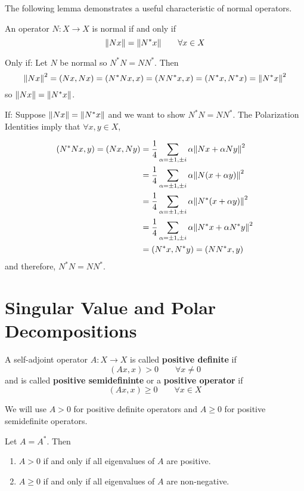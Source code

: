 The following lemma demonstrates a useful characteristic of normal operators. 

\begin{lemma}
An operator $N: X \rightarrow X$ is normal if and only if 
$$\norm{Nx} = \norm{N^{*} x} \qquad \forall x \in X$$
\end{lemma}

\begin{lproof}
Only if: Let $N$ be normal so $N^{*}N = NN^{*}$. Then 
$$\norm{Nx}^{2} = (Nx, Nx) = (N^{*}Nx, x) = (NN^{*} x, x) = (N^{*} x, N^{*} x) = \norm{N^{*} x}^{2} $$
so $\norm{Nx} = \norm{N^{*} x}$.

If: Suppose $\norm{Nx} = \norm{N^{*} x}$ and we want to show $N^{*}N = NN^{*}$. The Polarization Identities imply that $ \forall x, y \in X$, 

$$
\begin{aligned} 
(N^{*}N x, y) = (Nx, Ny) &= \frac{1}{4} \sum_{\alpha = \pm 1, \pm i} \alpha \norm{Nx + \alpha Ny}^{2} \\
&= \frac{1}{4} \sum_{\alpha = \pm 1, \pm i} \alpha \norm{N( x + \alpha y)}^{2} \\
&= \frac{1}{4} \sum_{\alpha = \pm 1, \pm i} \alpha \norm{N^{*} ( x + \alpha y)}^{2} \\
&= \frac{1}{4} \sum_{\alpha = \pm 1, \pm i} \alpha \norm{N^{*} x + \alpha N^{*} y}^{2} \\
&= (N^{*} x, N^{*} y) = (NN^{*} x, y)
\end{aligned} 
$$
and therefore, $N^{*}N = NN^{*}$. 
\end{lproof}

\section{Singular Value and Polar Decompositions}

\begin{definition}
A self-adjoint operator $A: X \rightarrow X$ is called \textbf{positive definite} if 
$$(Ax, x) > 0 \qquad \forall x \neq 0$$
and is called \textbf{positive semidefininte} or a \textbf{positive operator} if 
$$(Ax, x) \geq 0 \qquad \forall x \in X$$

We will use $A > 0$ for positive definite operators and $A \geq 0$ for positive semidefinite operators. 
\end{definition}

\begin{theorem}
Let $A = A^{*}$. Then 
\begin{enumerate}
	\item $A > 0$ if and only if all eigenvalues of $A$ are positive. 
	\item $A \geq 0$ if and only if all eigenvalues of $A$ are non-negative. 
\end{enumerate}
\end{theorem}


